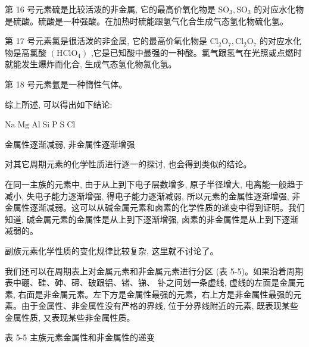 \documentclass[10pt]{article}
\begin{document}
第 16 号元素硫是比较活泼的非金属, 它的最高价氧化物是 \({\mathrm{{SO}}}_{3},{\mathrm{{SO}}}_{3}\) 的对应水化物是硫酸。硫酸是一种强酸。在加热时硫能跟氢气化合生成气态氢化物硫化氢。

第 17 号元素氯是很活泼的非金属, 它的最高价氧化物是 \({\mathrm{{Cl}}}_{2}{\mathrm{O}}_{7},{\mathrm{{Cl}}}_{2}{\mathrm{O}}_{7}\) 的对应水化物是高氯酸 \(\left( {\mathrm{{HClO}}}_{4}\right)\) ,它是已知酸中最强的一种酸。氯气跟氢气在光照或点燃时就能发生爆炸而化合, 生成气态氢化物氯化氢。

第 18 号元素氩是一种惰性气体。

综上所述, 可以得出如下结论:

\(\mathrm{{Na}}\;\mathrm{{Mg}}\;\mathrm{{Al}}\;\mathrm{{Si}}\;\mathrm{P}\;\mathrm{S}\;\mathrm{{Cl}}\)

金属性逐渐减弱, 非金属性逐渐增强

对其它周期元素的化学性质进行逐一的探讨, 也会得到类似的结论。

在同一主族的元素中, 由于从上到下电子层数增多, 原子半径增大, 电离能一般趋于减小, 失电子能力逐渐增强, 得电子能力逐渐减弱, 所以元素的金属性逐渐增强, 非金属性逐渐减弱。这可以从碱金属元素和卤素的化学性质的递变中得到证明。我们知道, 碱金属元素的金属性是从上到下逐渐增强, 卤素的非金属性是从上到下逐渐减弱的。

副族元素化学性质的变化规律比较复杂, 这里就不讨论了。

我们还可以在周期表上对金属元素和非金属元素进行分区 (表 5-5)。如果沿着周期表中硼、硅、砷、碲、破跟铝、锗、锑、 钋之间划一条虚线, 虚线的左面是金属元素, 右面是非金属元素。左下方是金属性最强的元素，右上方是非金属性最强的元素。由于金属性、非金属性没有严格的界线, 位于分界线附近的元素, 既表现某些金属性质, 又表现某些非金属性质。

表 5-5 主族元素金属性和非金属性的递变

\begin{center}
\end{center}
\end{document}
